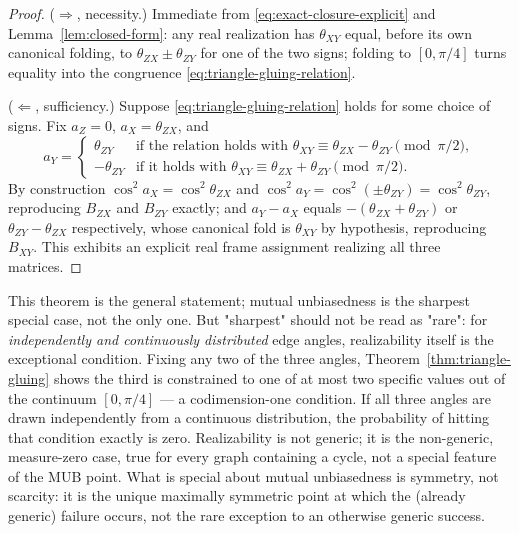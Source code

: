 \begin{proof}
($\Rightarrow$, necessity.) Immediate from \eqref{eq:exact-closure-explicit}
and Lemma~\ref{lem:closed-form}: any real realization has $\theta_{XY}$ equal,
before its own canonical folding, to $\theta_{ZX}\pm\theta_{ZY}$ for one of the
two signs; folding to $[0,\pi/4]$ turns equality into the congruence
\eqref{eq:triangle-gluing-relation}.

($\Leftarrow$, sufficiency.) Suppose \eqref{eq:triangle-gluing-relation} holds
for some choice of signs. Fix $a_Z = 0$, $a_X = \theta_{ZX}$, and
\begin{equation}
a_Y = \begin{cases} \theta_{ZY} & \text{if the relation holds with } \theta_{XY}
\equiv \theta_{ZX} - \theta_{ZY} \pmod{\pi/2}, \\ -\theta_{ZY} & \text{if it
holds with } \theta_{XY} \equiv \theta_{ZX} + \theta_{ZY} \pmod{\pi/2}. \end{cases}
\end{equation}
By construction $\cos^2 a_X = \cos^2\theta_{ZX}$ and $\cos^2 a_Y =
\cos^2(\pm\theta_{ZY}) = \cos^2\theta_{ZY}$, reproducing $B_{ZX}$ and $B_{ZY}$
exactly; and $a_Y - a_X$ equals $-(\theta_{ZX}+\theta_{ZY})$ or
$\theta_{ZY}-\theta_{ZX}$ respectively, whose canonical fold is $\theta_{XY}$
by hypothesis, reproducing $B_{XY}$. This exhibits an explicit real frame
assignment realizing all three matrices.
\end{proof}

\begin{remark}
This theorem is the general statement; mutual unbiasedness is the sharpest
special case, not the only one. But "sharpest" should not be read as
"rare": for \emph{independently and continuously distributed} edge angles,
realizability itself is the exceptional condition. Fixing any two of the
three angles, Theorem~\ref{thm:triangle-gluing} shows the third is
constrained to one of at most two specific values out of the continuum
$[0,\pi/4]$ — a codimension-one condition. If all three angles are drawn
independently from a continuous distribution, the probability of hitting
that condition exactly is zero. Realizability is not generic; it is the
non-generic, measure-zero case, true for every graph containing a cycle,
not a special feature of the MUB point. What is special about mutual
unbiasedness is symmetry, not scarcity: it is the unique maximally
symmetric point at which the (already generic) failure occurs, not the
rare exception to an otherwise generic success.
\end{remark}

